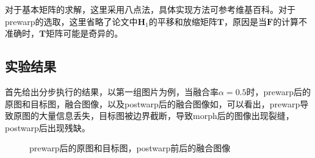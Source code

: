\documentclass[12pt,a4paper]{article}
\begin{document}
对于基本矩阵的求解，这里采用八点法，具体实现方法可参考维基百科\cite{eightpoint}。对于prewarp的选取，这里省略了论文中$\mathbf{H}_1$的平移和放缩矩阵$\textbf{T}$，原因是当$\mathbf{F}$的计算不准确时，$\textbf{T}$矩阵可能是奇异的。

\subsection{实验结果}

首先给出分步执行的结果，以第一组图片为例，当融合率$\alpha=0.5$时，prewarp后的原图和目标图，融合图像，以及postwarp后的融合图像如，可以看出，prewarp导致原图的大量信息丢失，目标图被边界截断，导致morph后的图像出现裂缝，postwarp后出现残缺。

\begin{figure}[H]
    \centering
    \caption{prewarp后的原图和目标图，postwarp前后的融合图像}
    \label{fig:step}
\end{figure}
\end{document}
